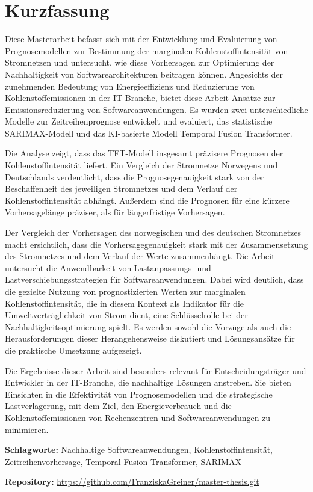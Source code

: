 \chapter*{Kurzfassung}
\thispagestyle{empty}
\noindent Diese Masterarbeit befasst sich mit der Entwicklung und Evaluierung von Prognosemodellen zur Bestimmung der marginalen Kohlenstoffintensität von Stromnetzen und untersucht, wie diese Vorhersagen zur Optimierung der Nachhaltigkeit von Softwarearchitekturen beitragen können.
Angesichts der zunehmenden Bedeutung von Energieeffizienz und Reduzierung von Kohlenstoffemissionen in der IT-Branche, bietet diese Arbeit Ansätze zur Emissionsreduzierung von Softwareanwendungen.
Es wurden zwei unterschiedliche Modelle zur Zeitreihenprognose entwickelt und evaluiert, das statistische SARIMAX-Modell und das KI-basierte Modell Temporal Fusion Transformer.

Die Analyse zeigt, dass das TFT-Modell insgesamt präzisere Prognosen der Kohlenstoffintensität liefert.
Ein Vergleich der Stromnetze Norwegens und Deutschlands verdeutlicht, dass die Prognosegenauigkeit stark von der Beschaffenheit des jeweiligen Stromnetzes und dem Verlauf der Kohlenstoffintensität abhängt.
Außerdem sind die Prognosen für eine kürzere Vorhersagelänge präziser, als für längerfristige Vorhersagen.

Der Vergleich der Vorhersagen des norwegischen und des deutschen Stromnetzes macht ersichtlich, dass die Vorhersagegenauigkeit stark mit der Zusammensetzung des Stromnetzes und dem Verlauf der Werte zusammenhängt.
Die Arbeit untersucht die Anwendbarkeit von Lastanpassungs- und Lastverschiebungsstrategien für Softwareanwendungen.
Dabei wird deutlich, dass die gezielte Nutzung von prognostizierten Werten zur marginalen Kohlenstoffintensität, die in diesem Kontext als Indikator für die Umweltverträglichkeit von Strom dient, eine Schlüsselrolle bei der Nachhaltigkeitsoptimierung spielt.
Es werden sowohl die Vorzüge als auch die Herausforderungen dieser Herangehensweise diskutiert und Lösungsansätze für die praktische Umsetzung aufgezeigt.

Die Ergebnisse dieser Arbeit sind besonders relevant für Entscheidungsträger und Entwickler in der IT-Branche, die nachhaltige Lösungen anstreben.
Sie bieten Einsichten in die Effektivität von Prognosemodellen und die strategische Lastverlagerung, mit dem Ziel, den Energieverbrauch und die Kohlenstoffemissionen von Rechenzentren und Softwareanwendungen zu minimieren.

\bigskip

\noindent
\textbf{Schlagworte:} Nachhaltige Softwareanwendungen, Kohlenstoffintensität, Zeitreihenvorhersage, Temporal Fusion Transformer, SARIMAX

\bigskip
\noindent
\textbf{Repository:}
\url{https://github.com/FranziskaGreiner/master-thesis.git}

